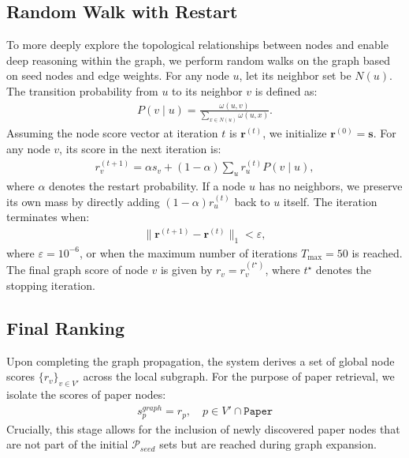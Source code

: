 \subsection{Random Walk with Restart}
To more deeply explore the topological relationships between nodes and enable deep reasoning within the graph, we perform random walks on the graph based on seed nodes and edge weights.
For any node $u$, let its neighbor set be $N(u)$. The transition probability from $u$ to its neighbor $v$ is defined as:
\begin{align}
    P(v \mid u) = \frac{\omega(u,v)}{\sum_{x \in N(u)} \omega(u,x)}.
\end{align}
Assuming the node score vector at iteration $t$ is $\mathbf{r}^{(t)}$, we initialize $\mathbf{r}^{(0)}=\mathbf{s}$.
For any node $v$, its score in the next iteration is:
\begin{align}
    r_v^{(t+1)} = \alpha s_v + (1-\alpha) \sum_{u} r_u^{(t)} P(v \mid u),
\end{align}
where $\alpha$ denotes the restart probability.
If a node $u$ has no neighbors, we preserve its own mass by directly adding $(1-\alpha)r_u^{(t)}$ back to $u$ itself.
The iteration terminates when:
\begin{align}
    \|\mathbf{r}^{(t+1)} - \mathbf{r}^{(t)}\|_1 < \varepsilon,
\end{align}
where $\varepsilon = 10^{-6}$, or when the maximum number of iterations $T_{\max} = 50$ is reached.
The final graph score of node $v$ is given by $r_v = r_v^{(t^\star)}$, where $t^\star$ denotes the stopping iteration.

\subsection{Final Ranking}
Upon completing the graph propagation, the system derives a set of global node scores $\{r_v\}_{v \in V'}$ across the local subgraph.
For the purpose of paper retrieval, we isolate the scores of paper nodes:
\begin{align}
\label{eq:spgraph}
    s_p^{graph} = r_p, \quad p \in V' \cap \texttt{Paper}
\end{align}
Crucially, this stage allows for the inclusion of newly discovered paper nodes that are not part of the initial $\mathcal{P}_{seed}$ sets but are reached during graph expansion. 

